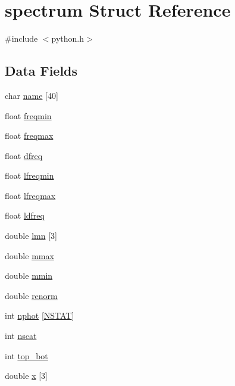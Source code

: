 \hypertarget{structspectrum}{}\section{spectrum Struct Reference}
\label{structspectrum}


{\ttfamily \#include $<$python.\+h$>$}

\subsection*{Data Fields}
\begin{DoxyCompactItemize}
\item 
char \hyperlink{structspectrum_a86749b492b0d4a2ab83c696c316e0fbc}{name} \mbox{[}40\mbox{]}
\item 
float \hyperlink{structspectrum_a70a161ec46644eea82821d77c20b13ca}{freqmin}
\item 
float \hyperlink{structspectrum_a1e3c6efa1f0d8438e84990b4e69db44e}{freqmax}
\item 
float \hyperlink{structspectrum_a1f6c195a4ff585124412ee2718243318}{dfreq}
\item 
float \hyperlink{structspectrum_a91db2b868acbdb5b3a88a182a754fe70}{lfreqmin}
\item 
float \hyperlink{structspectrum_ae5ca7c962612856ca7e5824f23df3ab3}{lfreqmax}
\item 
float \hyperlink{structspectrum_a4173b2f5a467bc28d72c7c8e4c321ca5}{ldfreq}
\item 
double \hyperlink{structspectrum_a7d970163bfe6485893b90bb22d85e25c}{lmn} \mbox{[}3\mbox{]}
\item 
double \hyperlink{structspectrum_a6f16d3fe14229087bf7a285bacce0b00}{mmax}
\item 
double \hyperlink{structspectrum_a2a1a99f9ec3161cc5ffc300b7350c5a6}{mmin}
\item 
double \hyperlink{structspectrum_ad91af7b07731d63817326975b3e883d7}{renorm}
\item 
int \hyperlink{structspectrum_ac9328e98ffae503d8f0ce5ba8379a016}{nphot} \mbox{[}\hyperlink{python_8h_a4a9a1642d81917a657708ea18c9c075c}{N\+S\+T\+AT}\mbox{]}
\item 
int \hyperlink{structspectrum_a04d2a8c73e62086593a49f14eedac9b2}{nscat}
\item 
int \hyperlink{structspectrum_aa17c0e97d29cc7645d590f61487f503e}{top\+\_\+bot}
\item 
double \hyperlink{structspectrum_abd9f0618b17be2f3f1795059e0adf9e0}{x} \mbox{[}3\mbox{]}

\end{DoxyCompactItemize}
